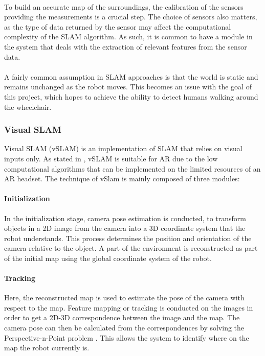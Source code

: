 \paragraph{} To build an accurate map of the surroundings, the calibration of the sensors providing the measurements is a crucial step. The choice of sensors also matters, as the type of data returned by the sensor may affect the computational complexity of the SLAM algorithm. As such, it is common to have a module in the system that deals with the extraction of relevant features from the sensor data.

\paragraph{}A fairly common assumption in SLAM approaches is that the world is static and remains unchanged as the robot moves. This becomes an issue with the goal of this project, which hopes to achieve the ability to detect humans walking around the wheelchair. 

\subsubsection{Visual SLAM}
Visual SLAM (vSLAM) is an implementation of SLAM that relies on visual inputs only. As stated in \cite{Taketomi2017}, vSLAM is suitable for AR due to the low computational algorithms that can be implemented on the limited resources of an AR headset. The technique of vSlam is mainly composed of three modules:

\paragraph{Initialization}
In the initialization stage, camera pose estimation is conducted, to transform objects in a 2D image from the camera into a 3D coordinate system that the robot understands. This process determines the position and orientation of the camera relative to the object. A part of the environment is reconstructed as part of the initial map using the global coordinate system of the robot.

\paragraph{Tracking}
Here, the reconstructed map is used to estimate the pose of the camera with respect to the map. Feature mapping or tracking is conducted on the images in order to get a 2D-3D correspondence between the image and the map. The camera pose can then be calculated from the correspondences by solving the Perspective-n-Point problem \citep{Nister2004}. This allows the system to identify where on the map the robot currently is.

